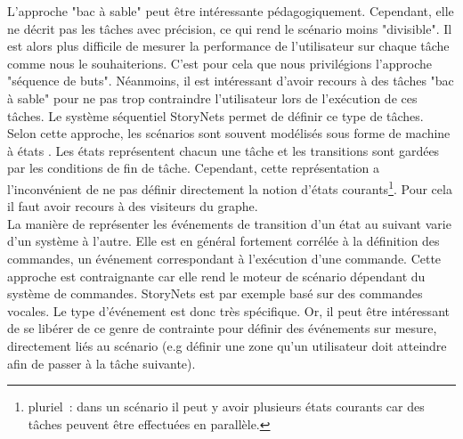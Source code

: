 \documentclass[11pt]{article}
\begin{document}
L'approche "bac à sable" peut être intéressante pédagogiquement. Cependant, elle ne décrit pas les tâches avec précision, ce qui rend le scénario moins "divisible". Il est alors plus difficile de mesurer la performance de l'utilisateur sur chaque tâche comme nous le souhaiterions. C'est pour cela que nous privilégions l'approche "séquence de buts". Néanmoins, il est intéressant d'avoir recours à des tâches "bac à sable" pour ne pas trop contraindre l'utilisateur lors de l'exécution de ces tâches. Le système séquentiel StoryNets \cite{storynode} permet de définir ce type de tâches.
\\

Selon cette approche, les scénarios sont souvent modélisés sous forme de machine à états \cite{state-machine}. Les états représentent chacun une tâche et les transitions sont gardées par les conditions de fin de tâche. Cependant, cette représentation a l'inconvénient de ne pas définir directement la notion d'états courants\footnote{pluriel~: dans un scénario il peut y avoir plusieurs états courants car des tâches peuvent être effectuées en parallèle.}. Pour cela il faut avoir recours à des visiteurs du graphe.
\\

La manière de représenter les événements de transition d'un état au suivant varie d'un système à l'autre. Elle est en général fortement corrélée à la définition des commandes, un événement correspondant à l'exécution d'une commande. Cette approche est contraignante car elle rend le moteur de scénario dépendant du système de commandes. StoryNets est par exemple basé sur des commandes vocales. Le type d'événement est donc très spécifique. Or, il peut être intéressant de se libérer de ce genre de contrainte pour définir des événements sur mesure, directement liés au scénario (e.g définir une zone qu'un utilisateur doit atteindre afin de passer à la tâche suivante).
\\
\end{document}
